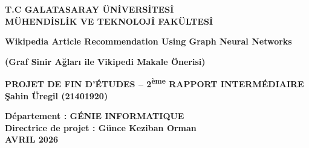 \begin{titlepage}
    \begin{center}
    	\large
        \vspace{-0.5cm}
    	\textbf{T.C GALATASARAY ÜN\.{I}VERS\.{I}TES\.{I}}\\
        \textbf{MÜHEND\.{I}SL\.{I}K VE TEKNOLOJ\.{I} FAKÜLTES\.{I}}
        \vspace{3.0cm}
        
        \textbf{Wikipedia Article Recommendation Using Graph Neural Networks}
        
        \textbf{(Graf Sinir Ağları ile Vikipedi Makale Önerisi)}
        
        \vspace{1.5cm}
        
        \textbf{PROJET DE FIN D'ÉTUDES -- 2\textsuperscript{ème} RAPPORT INTERMÉDIAIRE}\\
        
        \textbf{Şahin Üregil (21401920)}
       
        \vspace{1.5cm}
      
        
        \textbf{Département : GÉNIE INFORMATIQUE}\\
        \textbf{Directrice de projet : Günce Keziban Orman}\\
        \vfill
        \textbf{AVRIL 2026}
       
    \end{center}
\end{titlepage}
\restoregeometry